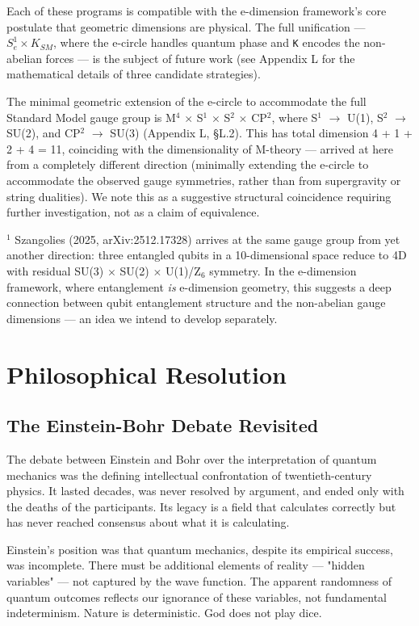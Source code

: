 \documentclass[aps,prd,preprint,superscriptaddress,longbibliography,floatfix]{revtex4-2}
\theoremstyle{remark}
\begin{document}
Each of these programs is compatible with the e-dimension framework's core postulate that geometric dimensions are physical. The full unification --- $S^{1}_e \times K_{SM}$, where the e-circle handles quantum phase and \texttt{K} encodes the non-abelian forces --- is the subject of future work (see Appendix L for the mathematical details of three candidate strategies).

The minimal geometric extension of the e-circle to accommodate the full Standard Model gauge group is M$^{4}$ $\times$ S$^{1}$ $\times$ S$^{2}$ $\times$ CP$^{2}$, where S$^{1}$ $\to$ U(1), S$^{2}$ $\to$ SU(2), and CP$^{2}$ $\to$ SU(3) (Appendix L, \S{}L.2). This has total dimension 4 + 1 + 2 + 4 = 11, coinciding with the dimensionality of M-theory --- arrived at here from a completely different direction (minimally extending the e-circle to accommodate the observed gauge symmetries, rather than from supergravity or string dualities). We note this as a suggestive structural coincidence requiring further investigation, not as a claim of equivalence.


$^{1}$ Szangolies (2025, arXiv:2512.17328) arrives at the same gauge group from yet another direction: three entangled qubits in a 10-dimensional space reduce to 4D with residual SU(3) $\times$ SU(2) $\times$ U(1)/Z$_{6}$ symmetry. In the e-dimension framework, where entanglement \textit{is} e-dimension geometry, this suggests a deep connection between qubit entanglement structure and the non-abelian gauge dimensions --- an idea we intend to develop separately.



\section{Philosophical Resolution}



\subsection{The Einstein-Bohr Debate Revisited}

The debate between Einstein and Bohr over the interpretation of quantum mechanics was the defining intellectual confrontation of twentieth-century physics. It lasted decades, was never resolved by argument, and ended only with the deaths of the participants. Its legacy is a field that calculates correctly but has never reached consensus about what it is calculating.

Einstein's position was that quantum mechanics, despite its empirical success, was incomplete. There must be additional elements of reality --- "hidden variables" --- not captured by the wave function. The apparent randomness of quantum outcomes reflects our ignorance of these variables, not fundamental indeterminism. Nature is deterministic. God does not play dice.
\end{document}
